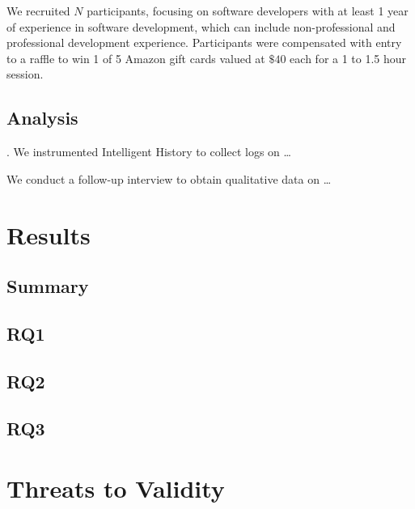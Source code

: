 We recruited $N$ participants, focusing on software developers with at least 1 year of experience in software development, which can include non-professional and professional development experience.
Participants were compensated with entry to a raffle to win 1 of 5 Amazon gift cards valued at $\$40$  each for a 1 to 1.5 hour session.

\subsection{Analysis}

. We instrumented Intelligent History to collect logs on \dots

 We conduct a follow-up interview to obtain qualitative data on \dots

\section{Results}
\label{sec:Results}

\subsection{Summary}

\subsection{RQ1}

\subsection{RQ2}

\subsection{RQ3}

\section{Threats to Validity}
\label{sec:Threads-to-Validity}


\endinput

Any text after an \endinput is ignored.
You could put scraps here or things in progress.